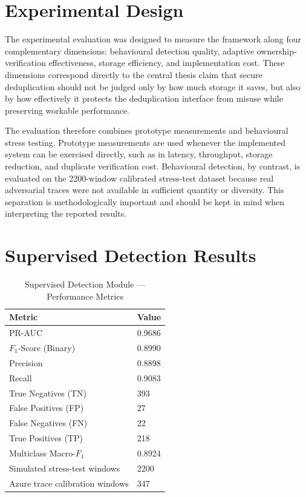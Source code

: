 \documentclass[12pt,a4paper,oneside]{report}
\begin{document}
\section{Experimental Design}

The experimental evaluation was designed to measure the framework along four complementary dimensions: behavioural detection quality, adaptive ownership-verification effectiveness, storage efficiency, and implementation cost.
These dimensions correspond directly to the central thesis claim that secure deduplication should not be judged only by how much storage it saves, but also by how effectively it protects the deduplication interface from misuse while preserving workable performance.

The evaluation therefore combines prototype measurements and behavioural stress testing.
Prototype measurements are used whenever the implemented system can be exercised directly, such as in latency, throughput, storage reduction, and duplicate verification cost.
Behavioural detection, by contrast, is evaluated on the 2200-window calibrated stress-test dataset because real adversarial traces were not available in sufficient quantity or diversity.
This separation is methodologically important and should be kept in mind when interpreting the reported results.

\section{Supervised Detection Results}

\begin{table}[H]
\centering
\caption{Supervised Detection Module — Performance Metrics}
\label{tab:sup}
\begin{tabularx}{\textwidth}{L{9cm}C{4cm}}
\toprule
\textbf{Metric} & \textbf{Value} \\
\midrule
PR-AUC                                             & 0.9686 \\
$F_1$-Score (Binary)                               & 0.8990 \\
Precision                                          & 0.8898 \\
Recall                                             & 0.9083 \\
True Negatives (TN)                                & 393 \\
False Positives (FP)                               & 27 \\
False Negatives (FN)                               & 22 \\
True Positives (TP)                                & 218 \\
Multiclass Macro-$F_1$                             & 0.8924 \\
\midrule
Simulated stress-test windows                           & 2200 \\
Azure trace calibration windows                         & 347 \\
\bottomrule
\end{tabularx}
\end{table}
\end{document}
